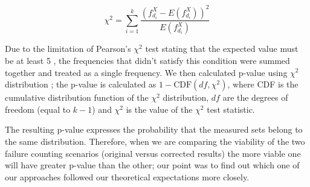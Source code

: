 \documentclass[
  digital,  	%
  color,		%
  oneside,   	%
  12pt,
  nocover,
  notable,
  nolof,
  nolot,
]{fithesis3}
\theoremstyle{definition}
\theoremstyle{remark}
\begin{document}
\begin{equation}
\label{eq:chi_square_stat}
\chi^2 = \sum\limits_{i=1}^{k} \frac{  \left(f_{d_i}^{X} - E \left(f_{d_i}^{X}\right) \right)^2 }{E \left(f_{d_i}^{X}\right)}
\end{equation}

Due to the limitation of Pearson's $\chi^2$ test stating that the expected value must be at least 5 \cite[p.~220]{stat-handbook}, the frequencies that didn't satisfy this condition were summed together and treated as a single frequency. We then calculated p-value using $\chi^2$ distribution \cite[p.~116]{stat-handbook}; the p-value is calculated as $1 - \text{CDF}(df, \chi^2)$, where CDF is the cumulative distribution function of the $\chi^2$ distribution, $df$ are the degrees of freedom (equal to $k-1$) and $\chi^2$ is the value of the $\chi^2$ test statistic.

The resulting p-value expresses the probability that the measured sets belong to the same distribution. Therefore, when we are comparing the viability of the two failure counting scenarios (original versus corrected results) the more viable one will have greater p-value than the other; our point was to find out which one of our approaches followed our theoretical expectations more closely.
\end{document}
